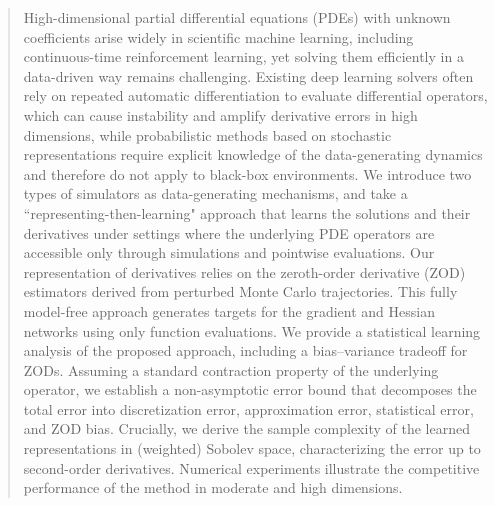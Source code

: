 \documentclass[twoside,11pt]{article}
\newcommand{\1}{\mathbf{1}}
\numberwithin{equation}{section}
\begin{document}
\begin{abstract}%

High-dimensional partial differential equations (PDEs) with unknown coefficients arise widely in scientific machine learning, including continuous-time reinforcement learning, yet solving them efficiently in a data-driven way remains challenging. Existing deep learning solvers often rely on repeated automatic differentiation to evaluate differential operators, which can cause instability and amplify derivative errors in high dimensions, while probabilistic methods based on stochastic representations require explicit knowledge of the data-generating dynamics and therefore do not apply to black-box environments. 
We introduce two types of simulators
as data-generating mechanisms, and take a ``representing-then-learning" approach that
learns the solutions and their derivatives under settings where the underlying PDE operators are accessible
only through simulations and pointwise evaluations. Our representation of derivatives relies on the zeroth-order derivative (ZOD) estimators derived from perturbed Monte Carlo trajectories. This fully model-free approach generates targets for the gradient and Hessian networks using only function evaluations.
We provide a statistical learning analysis of the proposed approach, including a bias--variance tradeoff for ZODs. Assuming a standard contraction property of the underlying operator, we establish a non-asymptotic error bound that decomposes the total error into discretization error, approximation error, statistical error, and ZOD bias. Crucially, we derive the sample complexity of the learned representations in (weighted) Sobolev space, characterizing the error up to second-order derivatives. Numerical experiments illustrate the competitive performance of the method in moderate and high dimensions.
\end{abstract}
\end{document}
